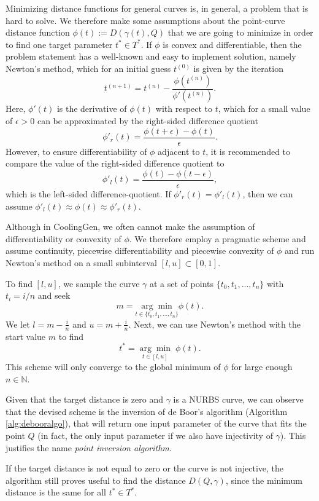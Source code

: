 \documentclass[a4paper, 11pt]{report}
\theoremstyle{definition}
\renewcommand{\emph}[1]{\textit{#1}}
\begin{document}
	Minimizing distance functions for general curves is, in general, a problem that is hard to solve. We therefore make some assumptions about the point-curve distance function $\phi(t) := D(\gamma(t), Q)$ that we are going to minimize in order to find one target parameter $t^* \in T^*$. If $\phi$ is convex and differentiable, then the problem statement has a well-known and easy to implement solution, namely Newton's method, which for an initial guess $t^{(0)}$ is given by the iteration
		$$ t^{(n+1)} = t^{(n)} - \frac {\phi(t^{(n)})}{\phi'(t^{(n)})}. $$
	Here, $\phi'(t)$ is the derivative of $\phi(t)$ with respect to $t$, which for a small value of $\epsilon > 0$ can be approximated by the right-sided difference quotient
		$$ \phi'_r(t) = \frac{\phi(t+\epsilon) - \phi(t)}{\epsilon}. $$
	However, to ensure differentiability of $\phi$ adjacent to $t$, it is recommended to compare the value of the right-sided difference quotient to
		$$ \phi'_l(t) = \frac{\phi(t) - \phi(t-\epsilon)}{\epsilon}, $$
	which is the left-sided difference-quotient. If $\phi'_r(t) = \phi'_l(t)$, then we can assume $\phi'_l(t) \approx \phi(t) \approx \phi'_r(t)$.

	Although in CoolingGen, we often cannot make the assumption of differentiability or convexity of $\phi$. We therefore employ a pragmatic scheme and assume continuity, piecewise differentiability and piecewise convexity of $\phi$ and run Newton's method on a small subinterval $[l,u] \subset [0,1]$.

	To find $[l,u]$, we sample the curve $\gamma$ at a set of points $\{t_0, t_1, ..., t_n\}$ with $t_i = i/n$ and seek
		$$ m = \underset{t\in\{t_0, t_1, ..., t_n\}}{\arg\min} \phi(t). $$
	We let $l = m - \frac{i}{n}$ and $u = m + \frac{i}{n}$. Next, we can use Newton's method with the start value $m$ to find
		$$ t^* = \underset{t\in[l,u]}{\arg\min}\;\phi(t). $$
	This scheme will only converge to the global minimum of $\phi$ for large enough $n \in \mathbb{N}$.

	Given that the target distance is zero and $\gamma$ is a NURBS curve, we can observe that the devised scheme is the inversion of de Boor's algorithm (Algorithm \ref{alg:debooralgo}), that will return one input parameter of the curve that fits the point $Q$ (in fact, the only input parameter if we also have injectivity of $\gamma$). This justifies the name \emph{point inversion algorithm}.

	If the target distance is not equal to zero or the curve is not injective, the algorithm still proves useful to find the distance $D(Q, \gamma)$, since the minimum distance is the same for all $t^* \in T^*$.
\end{document}
